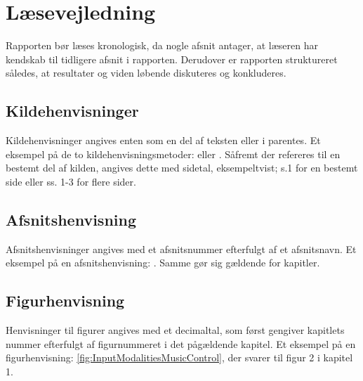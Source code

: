 \section*{Læsevejledning}
\label{Laesevejledning}
Rapporten bør læses kronologisk, da nogle afsnit antager, at læseren har kendskab til tidligere afsnit i rapporten. Derudover er rapporten struktureret således, at resultater og viden løbende diskuteres og konkluderes.
%
\subsection*{Kildehenvisninger}
Kildehenvisninger angives enten som en del af teksten eller i parentes. Et eksempel på de to kildehenvisningsmetoder: \textcite[s. 3]{PDF:PIIntroduction} eller \parencite[s. 1]{PDF:PIIntroduction}. Såfremt der refereres til en bestemt del af kilden, angives dette med sidetal, eksempeltvist; s.1 for en bestemt side eller ss. 1-3 for flere sider.
%
\subsection*{Afsnitshenvisning}
Afsnitshenvisninger angives med et afsnitsnummer efterfulgt af et afsnitsnavn. Et eksempel på en afsnitshenvisning: . Samme gør sig gældende for kapitler.
%
\subsection*{Figurhenvisning}
Henvisninger til figurer angives med et decimaltal, som først gengiver kapitlets nummer efterfulgt af figurnummeret i det pågældende kapitel. Et eksempel på en figurhenvisning: \autoref{fig:InputModalitiesMusicControl}, der svarer til figur 2 i kapitel 1. 
%
